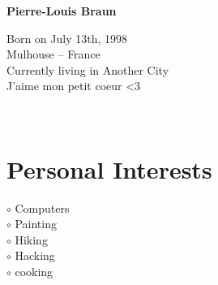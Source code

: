 \documentclass[a4paper,10pt]{article}
\begin{document}
\thispagestyle{empty}

\begin{adjustbox}{valign=t}
\begin{minipage}{0.3\textwidth} %
\begin{center}

\MySkip 	%

{\LARGE \bfseries Pierre-Louis Braun}

\MySkip 	%

Born on July 13th, 1998\\
Mulhouse -- France\\
Currently living in Another City\\
J'aime mon petit coeur <3\\

\MySkip 	%

\textcolor{ColorTwo}{\faEnvelopeO}
 \\

\textcolor{ColorTwo}{\faChain}
\end{center}

\vfill

\section*{Personal Interests}
\raggedright
\textcolor{ColorOne}{$\circ$} Computers\\
\textcolor{ColorOne}{$\circ$} Painting\\
\textcolor{ColorOne}{$\circ$} Hiking\\
\textcolor{ColorOne}{$\circ$} Hacking\\
\textcolor{ColorOne}{$\circ$} cooking\\


\end{minipage}
\end{adjustbox}
\end{document}
